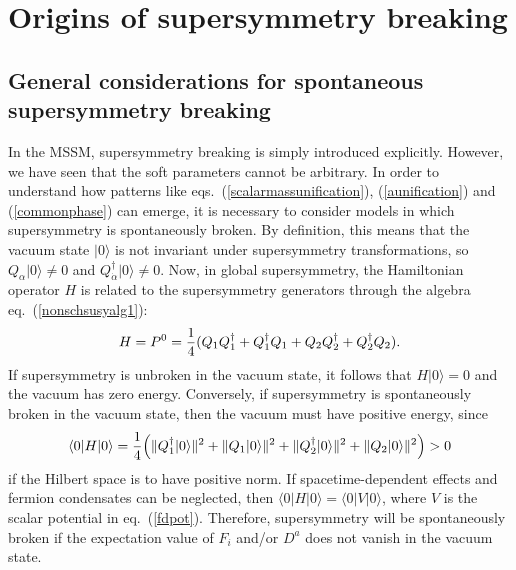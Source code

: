 \documentclass[11pt]{article}
\def\beq{\begin{eqnarray}}
\def\eeq{\end{eqnarray}}
\def\vac{|0\rangle}
\def\antivac{\langle 0|}
\begin{document}
\section{Origins of supersymmetry breaking}\label{sec:origins}
\subsection{General considerations for spontaneous
supersymmetry breaking}\label{subsec:origins.general}
\setcounter{equation}{0}
\setcounter{figure}{0}
\setcounter{table}{0}
\setcounter{footnote}{1}

In the MSSM, supersymmetry breaking is simply introduced explicitly.
However, we have seen that the soft parameters cannot be arbitrary. In
order to understand how patterns like eqs.~(\ref{scalarmassunification}),
(\ref{aunification}) and (\ref{commonphase}) can emerge, it is necessary
to consider models in which supersymmetry is spontaneously broken. By
definition, this means that the vacuum state $\vac$ is not invariant under
supersymmetry transformations, so $Q_\alpha \vac \not= 0$ and
$Q^\dagger_{\dot{\alpha}}\vac \not=0$. Now, in global supersymmetry, the
Hamiltonian operator $H$ is related to the supersymmetry generators
through the algebra eq.~(\ref{nonschsusyalg1}):
\beq
H=P^0 =
{1\over 4}( Q_1 Q_{{1}}^\dagger + Q_{{1}}^\dagger Q_1 
+ Q_2 Q_{{2}}^\dagger + Q_{{2}}^\dagger Q_2 ) .
\eeq
If supersymmetry is unbroken in the vacuum state, it follows that $H\vac =
0$ and the vacuum has zero energy. Conversely, if supersymmetry is
spontaneously broken in the vacuum state, then the vacuum must have
positive energy, since
\beq
\antivac H \vac = {1\over 4} \Bigl (\| Q_1^\dagger \vac \|^2 +
\| Q_{{1}} \vac \|^2
+ \| Q^\dagger_{2} \vac \|^2
+ \| Q_{{2}} \vac \|^2
\Bigr ) > 0
\eeq
if the Hilbert space is to have positive norm. If spacetime-dependent
effects and fermion condensates can be neglected, then $\antivac H\vac =
\antivac V \vac $, where $V$ is the scalar potential in eq.~(\ref{fdpot}).
Therefore, supersymmetry will be spontaneously broken if the 
expectation value of $F_i$ and/or
$D^a$ does not vanish in the vacuum state. 
\end{document}
